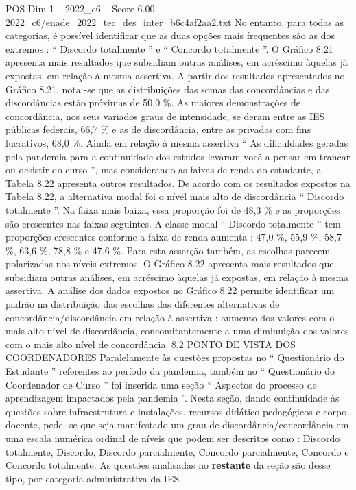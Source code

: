 \begin{textsample}{POS Dim 1 – 2022\_c6 – Score 6.00 – 2022\_c6/enade\_2022\_tec\_des\_inter\_b6c4af2aa2.txt}
No entanto, para todas as categorias, é possível identificar que as duas opções mais frequentes são as dos extremos : “ Discordo totalmente ” e “ Concordo totalmente ”.
O Gráfico 8.21 apresenta mais resultados que subsidiam outras análises, em acréscimo àquelas já expostas, em relação à mesma assertiva.
A partir dos resultados apresentados no Gráfico 8.21, nota -se que as distribuições das somas das concordâncias e das discordâncias estão próximas de 50,0 \%.
As maiores demonstrações de concordância, nos seus variados graus de intensidade, se deram entre as IES públicas federais, 66,7 \% e as de discordância, entre as privadas com fins lucrativos, 68,0 \%.
Ainda em relação à mesma assertiva “ As dificuldades geradas pela pandemia para a continuidade dos estudos levaram você a pensar em trancar ou desistir do curso ”, mas considerando as faixas de renda do estudante, a Tabela 8.22 apresenta outros resultados.
De acordo com os resultados expostos na Tabela 8.22, a alternativa modal foi o nível mais alto de discordância “ Discordo totalmente ”.
Na faixa mais baixa, essa proporção foi de 48,3 \% e as proporções são crescentes nas faixas seguintes.
A classe modal “ Discordo totalmente ” tem proporções crescentes conforme a faixa de renda aumenta : 47,0 \%, 55,9 \%, 58,7 \%, 63,6 \%, 78,8 \% e 47,6 \%.
Para esta asserção também, as escolhas parecem polarizadas nos níveis extremos.
O Gráfico 8.22 apresenta mais resultados que subsidiam outras análises, em acréscimo àquelas já expostas, em relação à mesma assertiva.
A análise dos dados expostos no Gráfico 8.22 permite identificar um padrão na distribuição das escolhas das diferentes alternativas de concordância/discordância em relação à assertiva : aumento dos valores com o mais alto nível de discordância, concomitantemente a uma diminuição dos valores com o mais alto nível de concordância. 8.2 PONTO DE VISTA DOS COORDENADORES Paralelamente às questões propostas no “ Questionário do Estudante ” referentes ao período da pandemia, também no “ Questionário do Coordenador de Curso ” foi inserida uma seção “ Aspectos do processo de aprendizagem impactados pela pandemia ”.
Nesta seção, dando continuidade às questões sobre infraestrutura e instalações, recursos didático-pedagógicos e corpo docente, pede -se que seja manifestado um grau de discordância/concordância em uma escala numérica ordinal de níveis que podem ser descritos como : Discordo totalmente, Discordo, Discordo parcialmente, Concordo parcialmente, Concordo e Concordo totalmente.
As questões analisadas no \textbf{restante} da seção são desse tipo, por categoria administrativa da IES.

\end{textsample}
